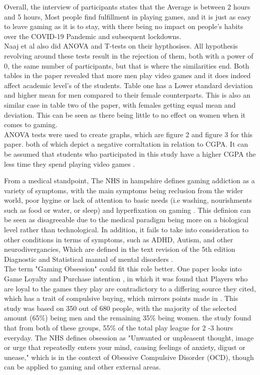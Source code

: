 \documentclass[conference]{IEEEtran}
\begin{document}
Overall, the interview of participants states that the Average is between 2 hours and 5 hours, Most people find fulfillment in playing games, and it is just as easy to leave gaming as it is to stay, with there being no impact on people's habits over the COVID-19 Pandemic and subsequent lockdowns.\\

Naaj et al also did ANOVA and T-tests on their hypthosises. All hypothesis revolving around these tests result in the rejection of them, both with a power of 0, the same number of participants, but that is where the similarities end. Both tables in the paper revealed that more men play video games and it does indeed affect academic level's of the students. Table one has a Lower standard deviation and higher mean for men compared to their female counterparts. This is also an similar case in table two of the paper, with females getting equal mean and deviation. This can be seen as there being little to no effect on women when it comes to gaming.\\

ANOVA tests were used to create graphs, which are figure 2 and figure 3 for this paper. both of which depict a negative corraltation in relation to CGPA. It can be assumed that students who participated in this study have a higher CGPA the less time they spend playing video games \cite{Naaj2021}.

From a medical standpoint, The NHS in hampshire defines gaming addiction as a variety of symptoms, with the main symptoms being reclusion from the wider world, poor hygine or lack of attention to basic needs (i.e washing, nourishments such as food or water, or sleep) and hyperfixation on gaming \cite{NHSHamp24}. This definion can be seen as disagreeable due to the medical paradigm being more on a biological level rather than technological. In addition, it fails to take into consideration to other conditions in terms of symptoms, such as ADHD, Autism, and other neurodivergancies, Which are defined in the text revision of the 5th edition Diagnostic and Statistical manual of mental disorders \cite{Association2022}.\\

The term "Gaming Obsession" could fit this role better. One paper looks into Game Loyalty and Purchase intention \cite{Ramli2022}, in which it was found that Players who are loyal to the games they play are contradictory to a differing source they cited\cite{Widodo2020}, which has a trait of compulsive buying, which mirrors points made in \cite {yasir2021}.  This study was based on 350 out of 680 people, with the majority of the selected amount (65\%) being men and the remaining 35\% being women. the study found that from both of these groups, 55\% of the total play league for 2 -3 hours everyday. The NHS  \cite{NHS2021} defines obsession as "Unwanted or unpleasent thought, image or urge that repeatedly enters your mind, causing feelings of anxiety, digust or unease," which is in the context of Obessive Compulsive Disorder (OCD), though can be applied to gaming and other external areas.\\
\end{document}
